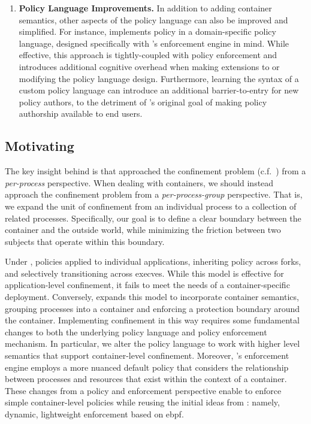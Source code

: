 \begin{enumerate}
  \item \textbf{Policy Language Improvements.}
    In addition to adding container semantics, other aspects of the \bpfbox{} policy
    language can also be improved and simplified. For instance, \bpfbox{} implements
    policy in a domain-specific policy language, designed specifically with \bpfbox{}'s
    enforcement engine in mind. While effective, this approach is tightly-coupled with
    policy enforcement and introduces additional cognitive overhead when making extensions
    to or modifying the policy language design. Furthermore, learning the syntax of
    a custom policy language can introduce an additional barrier-to-entry for new policy
    authors, to the detriment of \bpfbox{}'s original goal of making policy authorship
    available to end users.
\end{enumerate}

\subsection{Motivating \bpfcontain{}}

The key insight behind \bpfcontain{} is that \bpfbox{} approached the confinement problem
(c.f.\ ) from a \textit{per-process} perspective. When dealing
with containers, we should instead approach the confinement problem from
a \textit{per-process-group} perspective. That is, we expand the unit of confinement from
an individual process to a collection of related processes. Specifically, our goal is to
define a clear boundary between the container and the outside world, while minimizing the
friction between two subjects that operate within this boundary.

Under \bpfbox{}, policies applied to individual applications, inheriting policy across
forks, and selectively transitioning across execves. While this model is effective for
application-level confinement, it fails to meet the needs of a container-specific
deployment.  Conversely, \bpfcontain{} expands this model to incorporate container
semantics, grouping processes into a container and enforcing a protection boundary around
the container.  Implementing confinement in this way requires some fundamental changes to
both the underlying policy language and policy enforcement mechanism. In particular, we
alter the policy language to work with higher level semantics that support container-level
confinement. Moreover, \bpfcontain{}'s enforcement engine employs a more nuanced default
policy that considers the relationship between processes and resources that exist within
the context of a container. These changes from a policy and enforcement perspective enable
\bpfcontain{} to enforce simple container-level policies while reusing the initial ideas
from \bpfbox{}: namely, dynamic, lightweight enforcement based on \gls{ebpf}.

